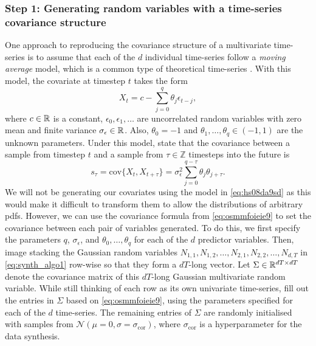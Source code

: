 \documentclass{statsmsc}
\begin{document}
{\subsubsection{Step 1: Generating random variables with a time-series covariance structure}%
\label{ssub:Step 1: Generating correlated random variables}

One approach to reproducing the covariance structure of a multivariate time-series is to assume
that each of the $d$ individual time-series follow a \textit{moving average} model, which is
a common type of theoretical time-series \citep{time-series}. With this model, the covariate at
timestep $t$ takes the form
\begin{equation}\label{eq:hs08da9sd}
    X_t=c-\sum^{q}_{j=0} \theta_j \epsilon_{t-j},
\end{equation}
where $c \in \mathbb{R}$ is a constant, $\epsilon_0,\epsilon_1,\dots$ are uncorrelated random variables with
zero mean and finite variance $\sigma_\epsilon\in\mathbb{R}$. Also, $\theta_0=-1$ and
$\theta_1,\dots,\theta_q \in (-1,1)$ are the unknown parameters.
Under this model, \cite{time-series} state that the covariance between a sample
from timestep $t$ and a sample from $\tau \in \mathbb{Z}$ timesteps into the
future is 
\begin{equation}\label{eq:osmmfoieie9}
    s_\tau=\textrm{cov}\{X_t,X_{t+\tau}\}=\sigma_\epsilon^2 \sum^{q-\tau}_{j=0}
    \theta_j \theta_{j+\tau}.
\end{equation}
We will not be generating our covariates using the model in \cref{eq:hs08da9sd} as this would
make it difficult to transform them to allow the distributions of arbitrary \acp{pdf}. However,
we can use the covariance formula from \cref{eq:osmmfoieie9} to set the covariance between each
pair of variables generated. To do this, we first specify the parameters $q$, $\sigma_\epsilon$, and
$\theta_0,\dots,\theta_q$ for each of the $d$ predictor variables. Then, image stacking the
Gaussian random variables $N_{1,1}, N_{1,2}, \dots, N_{2,1}, N_{2,2}, \dots,
N_{d,T}$ in \cref{eq:synth_algo1} row-wise so that they form a $dT$-long vector. Let $\Sigma \in \mathbb{R}^{dT\times dT}$ denote the covariance matrix of this $dT$-long Gaussian multivariate random variable.
While still thinking of each row as its own univariate time-series, fill out the entries in
$\Sigma$ based on \cref{eq:osmmfoieie9}, using the parameters specified for each of the $d$
time-series. The remaining entries of $\Sigma$ are randomly initialised with samples from
$\mathcal{N}(\mu=0,\sigma=\sigma_{\textrm{cor}})$, where
$\sigma_{\textrm{cor}}$ is a hyperparameter for the data synthesis.
}
\end{document}
